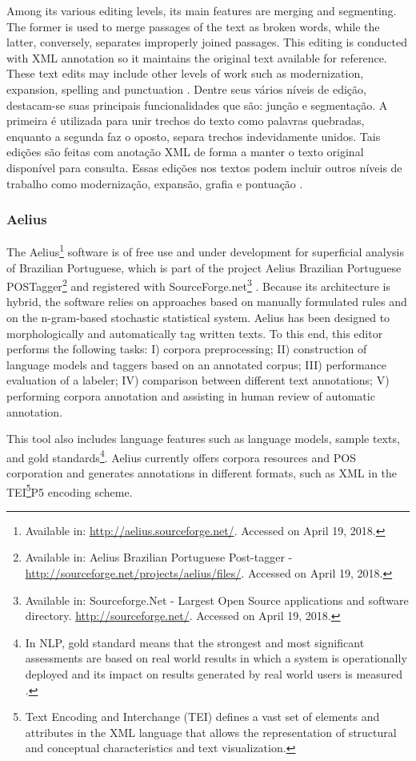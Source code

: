 \documentclass[english]{textolivre}
\begin{document}
Among its various editing levels, its main features are merging and segmenting. The former is used to merge passages of the text as broken words, while the latter, conversely, separates improperly joined passages. This editing is conducted with XML annotation so it maintains the original text available for reference. These text edits may include other levels of work such as modernization, expansion, spelling and punctuation \cite{sousa_o_2014, sousa_e-dictor:_2010, sousa_uma_2016}.
Dentre seus vários níveis de edição, destacam-se suas principais funcionalidades que são: junção e segmentação. A primeira é utilizada para unir trechos do texto como palavras quebradas, enquanto a segunda faz o oposto, separa trechos indevidamente unidos. Tais edições são feitas com anotação XML de forma a manter o texto original disponível para consulta. Essas edições nos textos podem incluir outros níveis de trabalho como modernização, expansão, grafia e pontuação \cite{sousa_o_2014, sousa_e-dictor:_2010, sousa_uma_2016}.

\subsubsection{Aelius}\label{sec-idioma}
The Aelius\footnote{Available in: \url{http://aelius.sourceforge.net/}. Accessed on April 19, 2018.} software is of free use and under development for superficial analysis of Brazilian Portuguese, which is part of the project Aelius Brazilian Portuguese POSTagger\footnote{Available in: Aelius Brazilian Portuguese Post-tagger - \url{http://sourceforge.net/projects/aelius/files/}. Accessed on April 19, 2018.} and registered with SourceForge.net\footnote{Available in: Sourceforge.Net - Largest Open Source applications and software directory. \url{http://sourceforge.net/}. Accessed on April 19, 2018.} \cite{alencar_aelius:_2010, alencar_aelius_2013a, alencar_aelius_2013b}. Because its architecture is hybrid, the software relies on approaches based on manually formulated rules and on the n-gram-based stochastic statistical system. Aelius has been designed to morphologically and automatically tag written texts. To this end, this editor performs the following tasks: I) corpora preprocessing; II) construction of language models and taggers based on an annotated corpus; III) performance evaluation of a labeler; IV) comparison between different text annotations; V) performing corpora annotation and assisting in human review of automatic annotation.

This tool also includes language features such as language models, sample texts, and gold standards\footnote{In NLP, gold standard means that the strongest and most significant assessments are based on real world results in which a system is operationally deployed and its impact on results generated by real world users is measured \cite{reiter_structured_2018}.}. Aelius currently offers corpora resources and POS corporation and generates annotations in different formats, such as XML in the TEI\footnote{Text Encoding and Interchange (TEI) defines a vast set of elements and attributes in the XML language that allows the representation of structural and conceptual characteristics and text visualization.}P5 encoding scheme.
\end{document}
